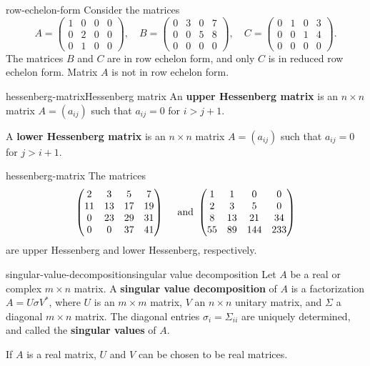 \begin{example}{row-echelon-form}
    Consider the matrices
    \[ A = \begin{pmatrix} 1 & 0 & 0 & 0 \\ 0 & 2 & 0 & 0 \\ 0 & 1 & 0 & 0 \end{pmatrix}, \quad
       B = \begin{pmatrix} 0 & 3 & 0 & 7 \\ 0 & 0 & 5 & 8 \\ 0 & 0 & 0 & 0 \end{pmatrix}, \quad
       C = \begin{pmatrix} 0 & 1 & 0 & 3 \\ 0 & 0 & 1 & 4 \\ 0 & 0 & 0 & 0 \end{pmatrix} . \]
    The matrices $B$ and $C$ are in row echelon form, and only $C$ is in reduced row echelon form. Matrix $A$ is not in row echelon form.
\end{example}

\begin{topic}{hessenberg-matrix}{Hessenberg matrix}
    An \textbf{upper Hessenberg matrix} is an $n \times n$ matrix $A = (a_{ij})$ such that $a_{ij} = 0$ for $i > j + 1$.
    
    A \textbf{lower Hessenberg matrix} is an $n \times n$ matrix $A = (a_{ij})$ such that $a_{ij} = 0$ for $j > i + 1$.
\end{topic}

\begin{example}{hessenberg-matrix}
    The matrices
    \[ \begin{pmatrix} 2 & 3 & 5 & 7 \\ 11 & 13 & 17 & 19 \\ 0 & 23 & 29 & 31 \\ 0 & 0 & 37 & 41 \end{pmatrix} \quad \textup { and } \begin{pmatrix} 1 & 1 & 0 & 0 \\ 2 & 3 & 5 & 0 \\ 8 & 13 & 21 & 34 \\ 55 & 89 & 144 & 233 \end{pmatrix} \]
    are upper Hessenberg and lower Hessenberg, respectively.
\end{example}

\begin{topic}{singular-value-decomposition}{singular value decomposition}
    Let $A$ be a real or complex $m \times n$ matrix. A \textbf{singular value decomposition} of $A$ is a factorization $A = U \sigma V^*$, where $U$ is an $m \times m$  matrix, $V$ an $n \times n$ unitary matrix, and $\Sigma$ a diagonal $m \times n$ matrix. The diagonal entries $\sigma_i = \Sigma_{ii}$ are uniquely determined, and called the \textbf{singular values} of $A$.
    
    If $A$ is a real matrix, $U$ and $V$ can be chosen to be real  matrices.
\end{topic}

